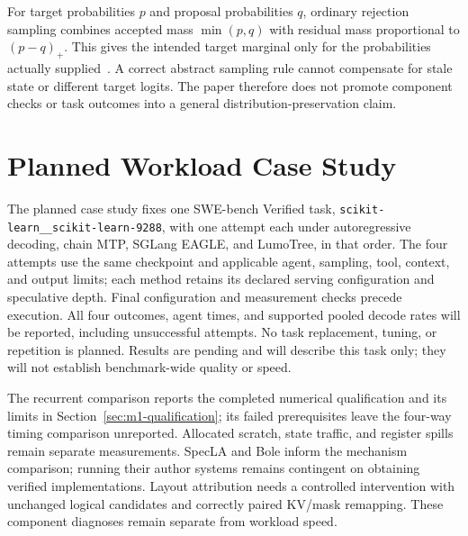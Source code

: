 \documentclass[conference]{IEEEtran}
\newcommand{\sys}{LumoTree}
\begin{document}
For target probabilities $p$ and proposal probabilities $q$, ordinary rejection sampling combines accepted mass $\min(p,q)$ with residual mass proportional to $(p-q)_+$. This gives the intended target marginal only for the probabilities actually supplied~\cite{leviathan2023fast,chen2023sampling}. A correct abstract sampling rule cannot compensate for stale state or different target logits. The paper therefore does not promote component checks or task outcomes into a general distribution-preservation claim.

\section{Planned Workload Case Study}
\label{app:validation}
The planned case study fixes one SWE-bench Verified task, \texttt{scikit-learn\_\_scikit-learn-9288}, with one attempt each under autoregressive decoding, chain MTP, SGLang EAGLE, and \sys{}, in that order. The four attempts use the same checkpoint and applicable agent, sampling, tool, context, and output limits; each method retains its declared serving configuration and speculative depth. Final configuration and measurement checks precede execution. All four outcomes, agent times, and supported pooled decode rates will be reported, including unsuccessful attempts. No task replacement, tuning, or repetition is planned. Results are pending and will describe this task only; they will not establish benchmark-wide quality or speed.

The recurrent comparison reports the completed numerical qualification and its limits in Section~\ref{sec:m1-qualification}; its failed prerequisites leave the four-way timing comparison unreported. Allocated scratch, state traffic, and register spills remain separate measurements. SpecLA and Bole inform the mechanism comparison; running their author systems remains contingent on obtaining verified implementations. Layout attribution needs a controlled intervention with unchanged logical candidates and correctly paired KV/mask remapping. These component diagnoses remain separate from workload speed.

\label{ReferencesStart}
\balance


\end{document}
